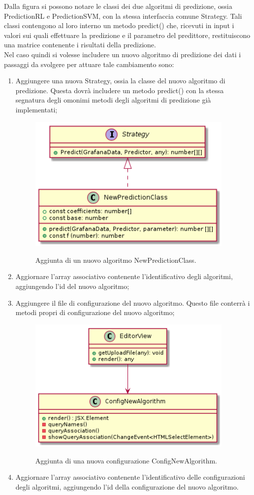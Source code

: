 \documentclass[../manuale-sviluppatore.tex]{subfiles}
\begin{document}
Dalla figura si possono notare le classi dei due algoritmi di predizione, ossia PredictionRL e PredictionSVM, con la stessa interfaccia comune Strategy.
Tali classi contengono al loro interno un metodo predict() che, ricevuti in input i valori sui quali effettuare la predizione e il parametro del predittore, restituiscono una matrice contenente i risultati della predizione. \\
Nel caso quindi si volesse includere un nuovo algoritmo di predizione dei dati i passaggi da svolgere per attuare tale cambiamento sono:
\begin{enumerate}
  \item Aggiungere una nuova Strategy, ossia la classe del nuovo algoritmo di predizione. Questa dovrà includere un metodo predict() con la stessa segnatura degli omonimi metodi degli algoritmi di predizione già implementati;
  \begin{figure}[H]
    \centering
    \includegraphics[width=10cm]{img/plugin/newstrategy.png}
    \label{fig:scice_documenti}
    \caption{Aggiunta di un nuovo algoritmo NewPredictionClass.}
  \end{figure}
  \item Aggiornare l'array associativo contenente l'identificativo degli algoritmi, aggiungendo l'id del nuovo algoritmo;
  \item Aggiungere il file di configurazione del nuovo algoritmo. Questo file conterrà i metodi propri di configurazione del nuovo algoritmo;
  \begin{figure}[H]
    \centering
    \includegraphics[width=10cm]{img/plugin/newconfig.png}
    \label{fig:scice_documenti}
    \caption{Aggiunta di una nuova configurazione ConfigNewAlgorithm.}
  \end{figure}
  \item Aggiornare l'array associativo contenente l'identificativo delle configurazioni degli algoritmi, aggiungendo l'id della configurazione del nuovo algoritmo.
\end{enumerate}
\end{document}
